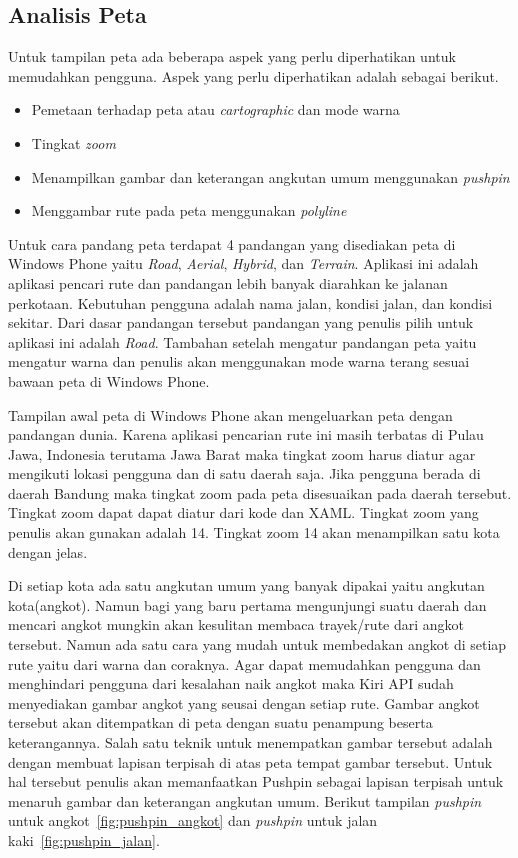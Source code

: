 \subsection{Analisis Peta}
\label{lab:Analisis Peta}
\hspace{0.5cm} Untuk tampilan peta ada beberapa aspek yang perlu diperhatikan untuk memudahkan pengguna. Aspek yang perlu diperhatikan adalah sebagai berikut.
\begin{itemize}
	\item Pemetaan terhadap peta atau \textit{cartographic} dan mode warna
	\item Tingkat \textit{zoom}
	\item Menampilkan gambar dan keterangan angkutan umum menggunakan \textit{pushpin}
	\item Menggambar rute pada peta menggunakan \textit{polyline}
\end{itemize}

Untuk cara pandang peta terdapat 4 pandangan yang disediakan peta di Windows Phone yaitu \textit{Road}, \textit{Aerial}, \textit{Hybrid}, dan \textit{Terrain}. Aplikasi ini adalah aplikasi pencari rute dan pandangan lebih banyak diarahkan ke jalanan perkotaan. Kebutuhan pengguna adalah nama jalan, kondisi jalan, dan kondisi sekitar. Dari dasar pandangan tersebut pandangan yang penulis pilih untuk aplikasi ini adalah \textit{Road}. Tambahan setelah mengatur pandangan peta yaitu mengatur warna dan penulis akan menggunakan mode warna terang sesuai bawaan peta di Windows Phone.

Tampilan awal peta di Windows Phone akan mengeluarkan peta dengan pandangan dunia. Karena aplikasi pencarian rute ini masih terbatas di Pulau Jawa, Indonesia terutama Jawa Barat maka tingkat zoom harus diatur agar mengikuti lokasi pengguna dan di satu daerah saja. Jika pengguna berada di daerah Bandung maka tingkat zoom pada peta disesuaikan pada daerah tersebut. Tingkat zoom dapat dapat diatur dari kode dan XAML. Tingkat zoom yang penulis akan gunakan adalah 14. Tingkat zoom 14 akan menampilkan satu kota dengan jelas.

Di setiap kota ada satu angkutan umum yang banyak dipakai yaitu angkutan kota(angkot). Namun bagi yang baru pertama mengunjungi suatu daerah dan mencari angkot mungkin akan kesulitan membaca trayek/rute dari angkot tersebut. Namun ada satu cara yang mudah untuk membedakan angkot di setiap rute yaitu dari warna dan coraknya. Agar dapat memudahkan pengguna dan menghindari pengguna dari kesalahan naik angkot maka Kiri API sudah menyediakan gambar angkot yang seusai dengan setiap rute. Gambar angkot tersebut akan ditempatkan di peta dengan suatu penampung beserta keterangannya. Salah satu teknik untuk menempatkan gambar tersebut adalah dengan membuat lapisan terpisah di atas peta tempat gambar tersebut. Untuk hal tersebut penulis akan memanfaatkan Pushpin sebagai lapisan terpisah untuk menaruh gambar dan keterangan angkutan umum. Berikut tampilan \textit{pushpin} untuk angkot~\ref{fig:pushpin_angkot} dan \textit{pushpin} untuk jalan kaki~\ref{fig:pushpin_jalan}.

